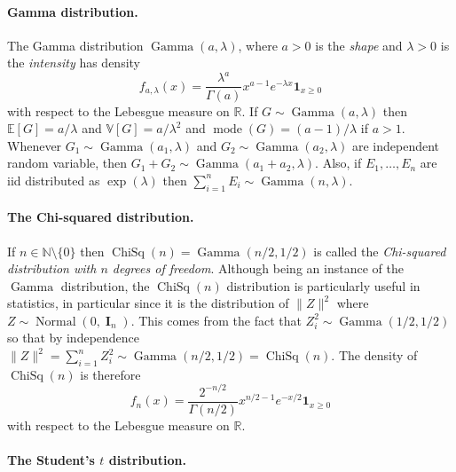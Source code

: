 \documentclass[
	fontsize=11pt, %
	twoside=false, %
	numbers=noenddot, %
]{kaobook}
\DeclareMathOperator{\bI}{{\boldsymbol I}}
\DeclareMathOperator{\mode}{mode}
\DeclareMathOperator{\chisq}{ChiSq}
\DeclareMathOperator{\gam}{Gamma}
\DeclareMathOperator{\nor}{Normal}
\newcommand{\E}{\mathbb E}
\newcommand{\R}{\mathbb R}
\newcommand{\N}{\mathbb N}
\newcommand{\var}{\mathbb V}
\newcommand{\ind}[1]{\mathbf 1_{#1}}
\newcommand{\norm}[1]{\| #1 \|}
\begin{document}
\paragraph{Gamma distribution.} %

The Gamma distribution $\gam(a, \lambda)$, where $a > 0$ is the \emph{shape} and $\lambda > 0$ is the \emph{intensity} has density
\begin{equation*}
	f_{a, \lambda}(x) = \frac{\lambda^a}{\Gamma(a)} x^{a - 1} e^{-\lambda x} \ind{x \geq 0}
\end{equation*}
with respect to the Lebesgue measure on $\R$.
%
If $G \sim \gam(a, \lambda)$ then $\E[G] = a / \lambda$ and $\var[G] = a / \lambda^2$ and $\mode(G) = (a - 1) / \lambda$ if $a > 1$.
Whenever $G_1 \sim \gam(a_1, \lambda)$ and $G_2 \sim \gam(a_2, \lambda)$ are independent random variable, then $G_1 + G_2 \sim \gam(a_1 + a_2, \lambda)$.
Also, if $E_1, \ldots, E_n$ are iid distributed as $\exp(\lambda)$ then $\sum_{i=1}^n E_i \sim \gam(n, \lambda)$.

\paragraph{The Chi-squared distribution.} %

If $n \in \N \setminus \{ 0 \}$ then $\chisq(n) = \gam(n/2, 1/2)$ is called the \emph{Chi-squared distribution with $n$ degrees of freedom}.
Although being an instance of the $\gam$ distribution, the $\chisq(n)$ distribution is particularly useful  in statistics, in particular since it is the distribution of $\norm{Z}^2$ where $Z \sim \nor(0, \bI_n)$. 
This comes from the fact that $Z_i^2 \sim \gam(1/2, 1/2)$ so that by independence $\norm{Z}^2 = \sum_{i=1}^n Z_i^2 \sim \gam(n/2, 1/2) = \chisq(n)$.
The density of $\chisq(n)$ is therefore 
\begin{equation*}
	f_n(x) = \frac{2^{-n / 2}}{\Gamma(n/2)} x^{n / 2 - 1} e^{-x / 2} \ind{x \geq 0}
\end{equation*}
with respect to the Lebesgue measure on $\R$.

\paragraph{The Student's $t$ distribution.} %
\end{document}
